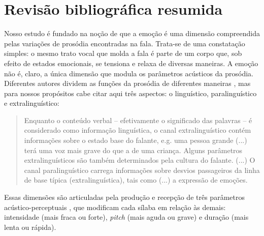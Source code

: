 \documentclass{tufte-handout}
\begin{document}
\section{Revisão bibliográfica resumida}\label{sec:revisao_bibliografica}

Nosso estudo é fundado na noção de que a emoção é uma dimensão compreendida pelas variações de prosódia encontradas na fala. Trata-se de uma constatação simples: o mesmo trato vocal que molda a fala é parte de um corpo que, sob efeito de estados emocionais, se tensiona e relaxa de diversas maneiras. A emoção não é, claro, a única dimensão que modula os parâmetros acústicos da prosódia. Diferentes autores dividem as funções da prosódia de diferentes maneiras \citep{schotz2002linguistic}, mas para nossos propósitos cabe citar aqui três aspectos: o linguístico, paralinguístico e extralinguístico: 

\begin{quotation}
    Enquanto o conteúdo verbal -- efetivamente o significado das palavras -- é considerado como informação linguística, o canal extralinguístico contém informações sobre o estado base do falante, e.g. uma pessoa grande (...) terá uma voz mais grave do que a de uma criança. Alguns parâmetros extralinguísticos são também determinados pela cultura do falante. (...) O canal paralinguístico carrega informações sobre desvios passageiros da linha de base típica (extralinguística), tais como (...) a expressão de emoções. 
\end{quotation}

Essas dimensões são articuladas pela produção e recepção de três parâmetros acústico-perceptuais , que modificam cada sílaba em relação às demais: intensidade (mais fraca ou forte), \textit{pitch} (mais aguda ou grave) e duração (mais lenta ou rápida).
\end{document}
